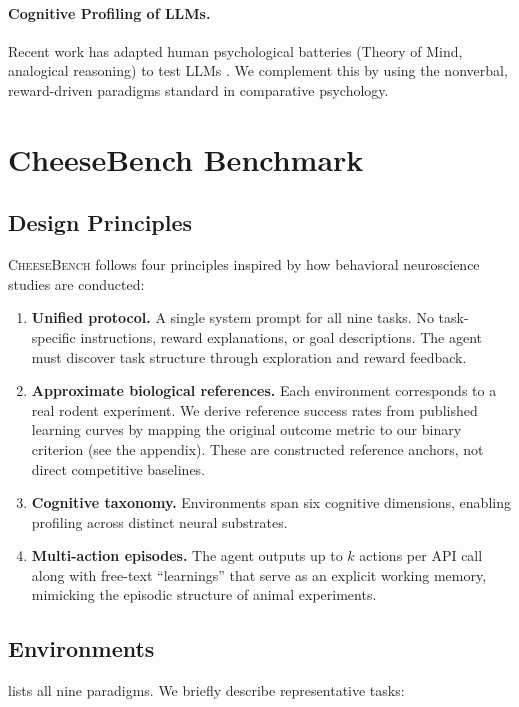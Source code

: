 \documentclass[letterpaper]{article}
\begin{document}
\paragraph{Cognitive Profiling of LLMs.}
Recent work has adapted human psychological batteries (Theory of Mind, analogical reasoning) to test LLMs \citep{kosinski2023theory,webb2023emergent}.
We complement this by using the nonverbal, reward-driven paradigms standard in comparative psychology.


\section{CheeseBench Benchmark}

\subsection{Design Principles}

\textsc{CheeseBench} follows four principles inspired by how behavioral neuroscience studies are conducted:

\begin{enumerate}
\item \textbf{Unified protocol.} A single system prompt for all nine tasks. No task-specific instructions, reward explanations, or goal descriptions. The agent must discover task structure through exploration and reward feedback.
\item \textbf{Approximate biological references.} Each environment corresponds to a real rodent experiment. We derive reference success rates from published learning curves by mapping the original outcome metric to our binary criterion (see the \emph{} appendix). These are constructed reference anchors, not direct competitive baselines.
\item \textbf{Cognitive taxonomy.} Environments span six cognitive dimensions, enabling profiling across distinct neural substrates.
\item \textbf{Multi-action episodes.} The agent outputs up to $k$ actions per API call along with free-text ``learnings'' that serve as an explicit working memory, mimicking the episodic structure of animal experiments.
\end{enumerate}

\subsection{Environments}

 lists all nine paradigms.  We briefly describe representative tasks:
\end{document}
